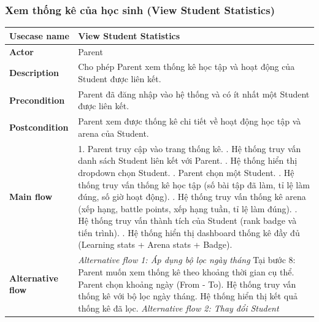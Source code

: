 \subsubsection{Xem thống kê của học sinh (View Student Statistics)}
\begin{table}[H]
\centering
\renewcommand{\arraystretch}{1.3}
\begin{tabular}{|l|p{}|}
\hline
\textbf{Usecase name} & View Student Statistics \\
\hline
\textbf{Actor} & Parent \\
\hline
\textbf{Description} & Cho phép Parent xem thống kê học tập và hoạt động của Student được liên kết. \\
\hline
\textbf{Precondition} & Parent đã đăng nhập vào hệ thống và có ít nhất một Student được liên kết. \\
\hline
\textbf{Postcondition} & Parent xem được thống kê chi tiết về hoạt động học tập và arena của Student. \\
\hline
\textbf{Main flow} & 
1. Parent truy cập vào trang thống kê. \newline
2. Hệ thống truy vấn danh sách Student liên kết với Parent. \newline
3. Hệ thống hiển thị dropdown chọn Student. \newline
4. Parent chọn một Student. \newline
5. Hệ thống truy vấn thống kê học tập (số bài tập đã làm, tỉ lệ làm đúng, số giờ hoạt động). \newline
6. Hệ thống truy vấn thống kê arena (xếp hạng, battle points, xếp hạng tuần, tỉ lệ làm đúng). \newline
7. Hệ thống truy vấn thành tích của Student (rank badge và tiến trình). \newline
8. Hệ thống hiển thị dashboard thống kê đầy đủ (Learning stats + Arena stats + Badge). \\
\hline
\textbf{Alternative flow} & 
\textit{Alternative flow 1: Áp dụng bộ lọc ngày tháng} \newline
Tại bước 8: Parent muốn xem thống kê theo khoảng thời gian cụ thể. \newline
Parent chọn khoảng ngày (From - To). \newline
Hệ thống truy vấn thống kê với bộ lọc ngày tháng. \newline
Hệ thống hiển thị kết quả thống kê đã lọc. \newline\newline
\textit{Alternative flow 2: Thay đổi Student} \newline

\end{tabular}
\end{table}
